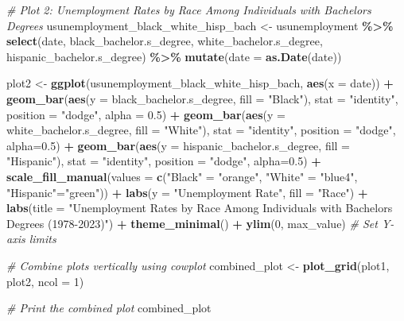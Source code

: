 \documentclass[
]{article}
\newenvironment{Shaded}{\begin{snugshade}}{\end{snugshade}}
\newcommand{\AttributeTok}[1]{\textcolor[rgb]{0.13,0.29,0.53}{#1}}
\newcommand{\CommentTok}[1]{\textcolor[rgb]{0.56,0.35,0.01}{\textit{#1}}}
\newcommand{\DecValTok}[1]{\textcolor[rgb]{0.00,0.00,0.81}{#1}}
\newcommand{\FloatTok}[1]{\textcolor[rgb]{0.00,0.00,0.81}{#1}}
\newcommand{\FunctionTok}[1]{\textcolor[rgb]{0.13,0.29,0.53}{\textbf{#1}}}
\newcommand{\NormalTok}[1]{#1}
\newcommand{\OtherTok}[1]{\textcolor[rgb]{0.56,0.35,0.01}{#1}}
\newcommand{\SpecialCharTok}[1]{\textcolor[rgb]{0.81,0.36,0.00}{\textbf{#1}}}
\newcommand{\StringTok}[1]{\textcolor[rgb]{0.31,0.60,0.02}{#1}}
\begin{document}
\begin{Shaded}
\begin{Highlighting}[]
\CommentTok{\# Plot 2: Unemployment Rates by Race Among Individuals with Bachelor\textquotesingle{}s Degrees}
\NormalTok{usunemployment\_black\_white\_hisp\_bach }\OtherTok{\textless{}{-}}\NormalTok{ usunemployment }\SpecialCharTok{\%\textgreater{}\%}
  \FunctionTok{select}\NormalTok{(date, black\_bachelor.s\_degree, white\_bachelor.s\_degree, hispanic\_bachelor.s\_degree) }\SpecialCharTok{\%\textgreater{}\%}
  \FunctionTok{mutate}\NormalTok{(}\AttributeTok{date =} \FunctionTok{as.Date}\NormalTok{(date))}

\NormalTok{plot2 }\OtherTok{\textless{}{-}} \FunctionTok{ggplot}\NormalTok{(usunemployment\_black\_white\_hisp\_bach, }\FunctionTok{aes}\NormalTok{(}\AttributeTok{x =}\NormalTok{ date)) }\SpecialCharTok{+}
  \FunctionTok{geom\_bar}\NormalTok{(}\FunctionTok{aes}\NormalTok{(}\AttributeTok{y =}\NormalTok{ black\_bachelor.s\_degree, }\AttributeTok{fill =} \StringTok{"Black"}\NormalTok{), }\AttributeTok{stat =} \StringTok{"identity"}\NormalTok{, }\AttributeTok{position =} \StringTok{"dodge"}\NormalTok{, }\AttributeTok{alpha =} \FloatTok{0.5}\NormalTok{) }\SpecialCharTok{+}
  \FunctionTok{geom\_bar}\NormalTok{(}\FunctionTok{aes}\NormalTok{(}\AttributeTok{y =}\NormalTok{ white\_bachelor.s\_degree, }\AttributeTok{fill =} \StringTok{"White"}\NormalTok{), }\AttributeTok{stat =} \StringTok{"identity"}\NormalTok{, }\AttributeTok{position =} \StringTok{"dodge"}\NormalTok{, }\AttributeTok{alpha=}\FloatTok{0.5}\NormalTok{) }\SpecialCharTok{+}
  \FunctionTok{geom\_bar}\NormalTok{(}\FunctionTok{aes}\NormalTok{(}\AttributeTok{y =}\NormalTok{ hispanic\_bachelor.s\_degree, }\AttributeTok{fill =} \StringTok{"Hispanic"}\NormalTok{), }\AttributeTok{stat =} \StringTok{"identity"}\NormalTok{, }\AttributeTok{position =} \StringTok{"dodge"}\NormalTok{, }\AttributeTok{alpha=}\FloatTok{0.5}\NormalTok{) }\SpecialCharTok{+}
  \FunctionTok{scale\_fill\_manual}\NormalTok{(}\AttributeTok{values =} \FunctionTok{c}\NormalTok{(}\StringTok{"Black"} \OtherTok{=} \StringTok{"orange"}\NormalTok{, }\StringTok{"White"} \OtherTok{=} \StringTok{"blue4"}\NormalTok{, }\StringTok{"Hispanic"}\OtherTok{=}\StringTok{"green"}\NormalTok{)) }\SpecialCharTok{+}
  \FunctionTok{labs}\NormalTok{(}\AttributeTok{y =} \StringTok{"Unemployment Rate"}\NormalTok{, }\AttributeTok{fill =} \StringTok{"Race"}\NormalTok{) }\SpecialCharTok{+}
  \FunctionTok{labs}\NormalTok{(}\AttributeTok{title =} \StringTok{"Unemployment Rates by Race Among Individuals with Bachelor\textquotesingle{}s Degrees (1978{-}2023)"}\NormalTok{) }\SpecialCharTok{+}
  \FunctionTok{theme\_minimal}\NormalTok{() }\SpecialCharTok{+}
  \FunctionTok{ylim}\NormalTok{(}\DecValTok{0}\NormalTok{, max\_value)  }\CommentTok{\# Set Y{-}axis limits}

\CommentTok{\# Combine plots vertically using cowplot}
\NormalTok{combined\_plot }\OtherTok{\textless{}{-}} \FunctionTok{plot\_grid}\NormalTok{(plot1, plot2, }\AttributeTok{ncol =} \DecValTok{1}\NormalTok{)}

\CommentTok{\# Print the combined plot}
\NormalTok{combined\_plot}
\end{Highlighting}
\end{Shaded}
\end{document}
